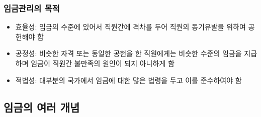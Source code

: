 \documentclass[aspectratio=169,xcolor=dvipsnames,handout]{beamer}
\begin{document}
\begin{frame}[allowframebreaks]
    \frametitle{임금관리의 목적}
    \begin{itemize}[<+->]
        \item 효율성: 임금의 수준에 있어서 직원간에 격차를 두어 직원의 동기유발을 위하여 공헌해야 함
        \item 공정성: 비슷한 자격 또는 동일한 공헌을 한 직원에게는 비슷한 수준의 임금을 지급하며 임금이 직원간 불만족의 원인이 되지 아니하게 함
        \item 적법성: 대부분의 국가에서 임금에 대한 많은 법령을 두고 이를 준수하여야 함
    \end{itemize}
\end{frame}

\subsection{임금의 여러 개념}%
\end{document}
